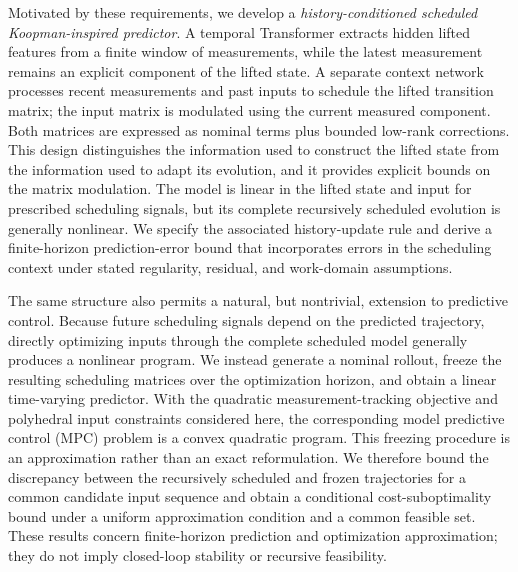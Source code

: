 \documentclass[journal]{IEEEtran}
\begin{document}
Motivated by these requirements, we develop a \emph{history-conditioned scheduled Koopman-inspired predictor}. A temporal Transformer extracts hidden lifted features from a finite window of measurements, while the latest measurement remains an explicit component of the lifted state. A separate context network processes recent measurements and past inputs to schedule the lifted transition matrix; the input matrix is modulated using the current measured component. Both matrices are expressed as nominal terms plus bounded low-rank corrections. This design distinguishes the information used to construct the lifted state from the information used to adapt its evolution, and it provides explicit bounds on the matrix modulation. The model is linear in the lifted state and input for prescribed scheduling signals, but its complete recursively scheduled evolution is generally nonlinear. We specify the associated history-update rule and derive a finite-horizon prediction-error bound that incorporates errors in the scheduling context under stated regularity, residual, and work-domain assumptions.

The same structure also permits a natural, but nontrivial, extension to predictive control. Because future scheduling signals depend on the predicted trajectory, directly optimizing inputs through the complete scheduled model generally produces a nonlinear program. We instead generate a nominal rollout, freeze the resulting scheduling matrices over the optimization horizon, and obtain a linear time-varying predictor. With the quadratic measurement-tracking objective and polyhedral input constraints considered here, the corresponding model predictive control (MPC) problem is a convex quadratic program. This freezing procedure is an approximation rather than an exact reformulation. We therefore bound the discrepancy between the recursively scheduled and frozen trajectories for a common candidate input sequence and obtain a conditional cost-suboptimality bound under a uniform approximation condition and a common feasible set. These results concern finite-horizon prediction and optimization approximation; they do not imply closed-loop stability or recursive feasibility.
\end{document}
